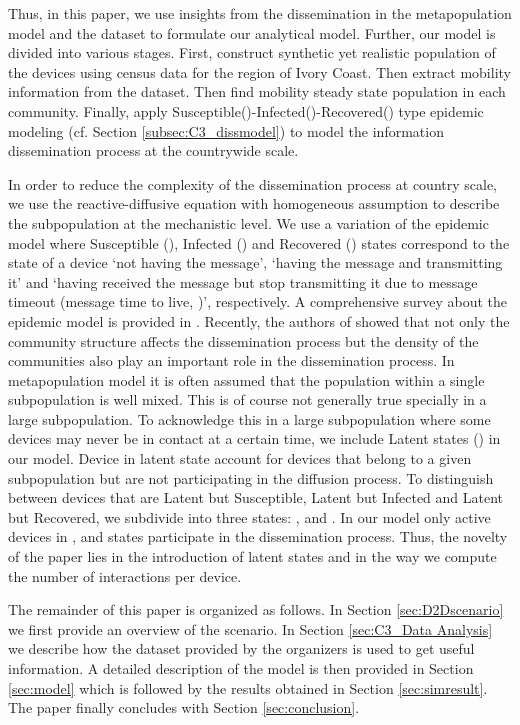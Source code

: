 \documentclass[review]{elsarticle}
\begin{document}
Thus, in this paper, we use insights from the dissemination in the metapopulation model and the  dataset to formulate our analytical model. Further, our model is divided into various stages. First, construct synthetic yet realistic population of the devices using census data \cite{Web1} for the region of Ivory Coast. Then extract mobility information from the  dataset. Then find mobility steady state population in each community. Finally, apply Susceptible()-Infected()-Recovered() type epidemic modeling (cf. Section \ref{subsec:C3_dissmodel}) to model the information dissemination process at the countrywide scale.

In order to reduce the complexity of the dissemination process at country scale, we use the reactive-diffusive equation with homogeneous assumption to describe the subpopulation at the mechanistic level. We use a variation of the  epidemic model where Susceptible (), Infected () and Recovered () states correspond to the state of a device `not having the message', `having the message and transmitting it' and `having received the message but stop transmitting it due to message timeout (message time to live, )', respectively. A comprehensive survey about the epidemic model is provided in \cite{Hethcote2000,Britton2010}. Recently, the authors of \cite{Lund2013} showed that not only the community structure affects the dissemination process but the density of the communities also play an important role in the dissemination process. In metapopulation model it is often assumed that the population within a single subpopulation is well mixed. This is of course not generally true specially in a large subpopulation. To acknowledge this in a large subpopulation where some devices may never be in contact at a certain time, we include Latent states () in our model. Device in latent state account for devices that belong to a given subpopulation but are not participating in the diffusion process. To distinguish between devices that are Latent but Susceptible, Latent but Infected and Latent but Recovered, we subdivide  into three states: ,  and . In our model only active devices in ,  and  states participate in the dissemination process. Thus, the novelty of the paper lies in the introduction of latent states and in the way we compute the number of interactions per device.

The remainder of this paper is organized as follows. In Section \ref{sec:D2Dscenario} we first provide an overview of the  scenario. In Section \ref{sec:C3_Data Analysis} we describe how the dataset provided by the  organizers is used to get useful information. A detailed description of the model is then provided in Section \ref{sec:model} which is followed by the results obtained in Section \ref{sec:simresult}. The paper finally concludes with Section \ref{sec:conclusion}.
\end{document}
